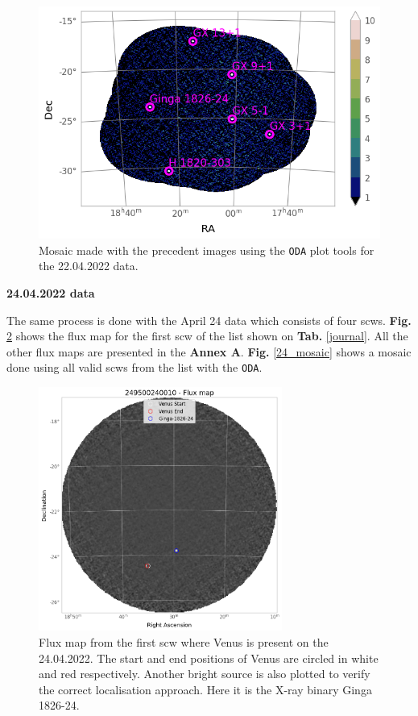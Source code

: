         \begin{figure}[H]
        \centering
        \includegraphics[width = 13cm]{report/Figures/methods/2204/oda_2204.png}
        \caption{Mosaic made with the precedent images using the \texttt{ODA} plot tools for the 22.04.2022 data.}
        \label{22_mosaic}
        \end{figure}
    
    \textbf{24.04.2022 data}
    
    The same process is done with the April 24 data which consists of four scws. \textbf{Fig.} \ref{24_map_single} shows the flux map for the first scw of the list shown on \textbf{Tab.} \ref{journal}. All the other flux maps are presented in the \textbf{Annex A}. \textbf{Fig.} \ref{24_mosaic} shows a mosaic done using all valid scws from the list with the \texttt{ODA}.

        \begin{figure}[H]
        \centering
        \includegraphics[width = 8cm]{report/Figures/methods/2404/24_map.png}
        \caption{Flux map from the first scw where Venus is present on the 24.04.2022. The start and end positions of Venus are circled in white and red respectively. Another bright source is also plotted to verify the correct localisation approach. Here it is the X-ray binary Ginga 1826-24.}
        \label{24_map_single}
        \end{figure}



